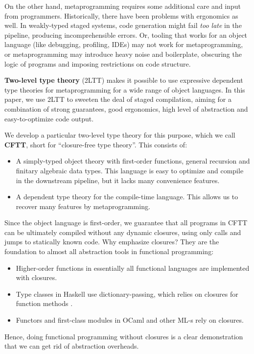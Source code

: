 \documentclass[acmsmall,screen,review,anonymous]{acmart}
\theoremstyle{remark}
\begin{document}
On the other hand, metaprogramming requires some additional care and input from
programmers. Historically, there have been problems with ergonomics as well. In
weakly-typed staged systems, code generation might fail \emph{too late} in the
pipeline, producing incomprehensible errors. Or, tooling that works for an
object language (like debugging, profiling, IDEs) may not work for metaprogramming, or
metaprogramming may introduce heavy noise and boilerplate, obscuring the logic
of programs and imposing restrictions on code structure.

\textbf{Two-level type theory} (2LTT) \cite{twolevel,staged2ltt} makes it
possible to use expressive dependent type theories for metaprogramming
for a wide range of object languages. In this paper, we use 2LTT to sweeten the
deal of staged compilation, aiming for a combination of strong guarantees, good
ergonomics, high level of abstraction and easy-to-optimize code output.

We develop a particular two-level type theory for this purpose, which we
call \textbf{CFTT}, short for ``closure-free type theory''. This consists
of:
\begin{itemize}
\item A simply-typed object theory with first-order functions, general recursion and
      finitary algebraic data types. This language is easy to optimize and compile
      in the downstream pipeline, but it lacks many convenience features.
\item A dependent type theory for the compile-time language. This
      allows us to recover many features by metaprogramming.
\end{itemize}
Since the object language is first-order, we guarantee that all programs in CFTT
can be ultimately compiled without any dynamic closures, using only calls and
jumps to statically known code. Why emphasize closures?  They are the
foundation to almost all abstraction tools in functional programming:
\begin{itemize}
\item Higher-order functions in essentially all functional languages are implemented with closures.
\item Type classes in Haskell use dictionary-passing, which relies on closures for function methods \cite{DBLP:conf/popl/WadlerB89}.
\item Functors and first-class modules in OCaml and other ML-s rely on closures.
\end{itemize}
Hence, doing functional programming without closures is a clear demonstration
that we can get rid of abstraction overheads.
\end{document}
